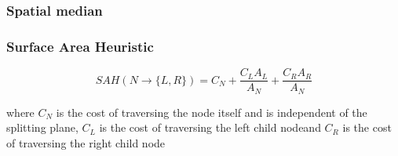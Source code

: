 





\subsubsection{Spatial median}







\subsubsection{Surface Area Heuristic}



\begin{displaymath}
  SAH(N \rightarrow \{L, R\}) = C_N + \frac{C_L A_L}{A_N} +
  \frac{C_R A_R}{A_N}
\end{displaymath}

where $C_N$ is the cost of traversing the node itself and is
independent of the splitting plane, $C_L$ is the cost of traversing
the left child nodeand $C_R$ is the cost of traversing the right child
node

